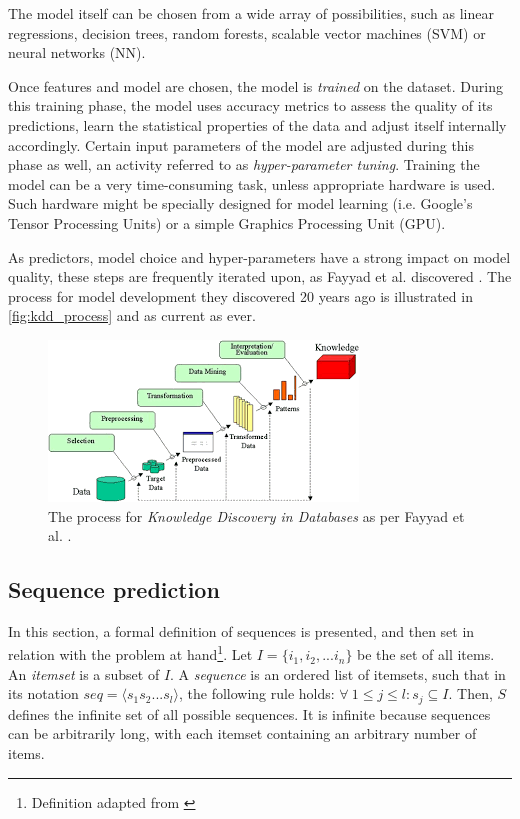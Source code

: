 The model itself can be chosen from a wide array of possibilities, such as linear regressions, decision trees, random forests, scalable vector machines (SVM) or neural networks (NN).

Once features and model are chosen, the model is \textit{trained} on the dataset. During this training phase, the model uses accuracy metrics to assess the quality of its predictions, learn the statistical properties of the data and adjust itself internally accordingly. Certain input parameters of the model are adjusted during this phase as well, an activity referred to as \textit{hyper-parameter tuning}. Training the model can be a very time-consuming task, unless appropriate hardware is used. Such hardware might be specially designed for model learning (i.e. Google's Tensor Processing Units) or a simple Graphics Processing Unit (GPU).

As predictors, model choice and hyper-parameters have a strong impact on model quality, these steps are frequently iterated upon, as Fayyad et al. discovered \cite{fayyad1996data}. The process for model development they discovered 20 years ago is illustrated in \autoref{fig:kdd_process} and as current as ever.

\begin{figure}
	\centering
	\includegraphics[width=\textwidth]{gfx/kdd_process}
	\caption{The process for \textit{Knowledge Discovery in Databases} as per Fayyad et al. \cite{fayyad1996data}.}
	\label{fig:kdd_process}
\end{figure}

\subsection{Sequence prediction}
In this section, a formal definition of sequences is presented, and then set in relation with the problem at hand\footnote{Definition adapted from \cite{pei2001prefixspan}}.  Let $I = \{i_1,i_2,...i_n\}$ be the set of all items. An \textit{itemset} is a subset of $I$. A \textit{sequence} is an ordered list of itemsets, such that in its notation $seq = \langle s_1s_2...s_l \rangle$, the following rule holds: $\forall\ 1 \leq j \leq l: s_j \subseteq I$. Then, $S$ defines the infinite set of all possible sequences. It is infinite because sequences can be arbitrarily long, with each itemset containing an arbitrary number of items.

